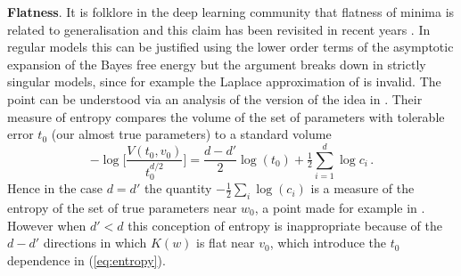 \documentclass{article} %
\begin{document}
\textbf{Flatness}. It is folklore in the deep learning community that flatness of minima is related to generalisation \citep{hinton_keeping_1993, hochreiter1997flat} and this claim has been revisited in recent years \citep{chaudhari2019entropy, smith2017bayesian, jastrzkebski2017three, zhang_energyentropy_2018}. In regular models this can be justified using the lower order terms of the asymptotic expansion of the Bayes free energy \citep[\S 3.1]{Balasubramanian:1996cond.mat..1030B} but the argument breaks down in strictly singular models, since for example the Laplace approximation of \citet{zhang_energyentropy_2018} is invalid. The point can be understood via an analysis of the version of the idea in \citep{hochreiter1997flat}. Their measure of entropy compares the volume of the set of parameters with tolerable error $t_0$ (our almost true parameters) to a standard volume
\begin{equation}\label{eq:entropy}
- \log\Big[\frac{V(t_0,v_0)}{t_0^{d/2}}\Big] = \frac{d-d'}{2} \log(t_0) + \tfrac{1}{2} \sum_{i=1}^{d} \log c_i\,.
\end{equation}
Hence in the case $d = d'$ the quantity $-\tfrac{1}{2} \sum_i \log(c_i)$ is a measure of the entropy of the set of true parameters near $w_0$, a point made for example in \citet{zhang_energyentropy_2018}. However when $d' < d$ this conception of entropy is inappropriate because of the $d - d'$ directions in which $K(w)$ is flat near $v_0$, which introduce the $t_0$ dependence in (\ref{eq:entropy}). %

\end{document}
